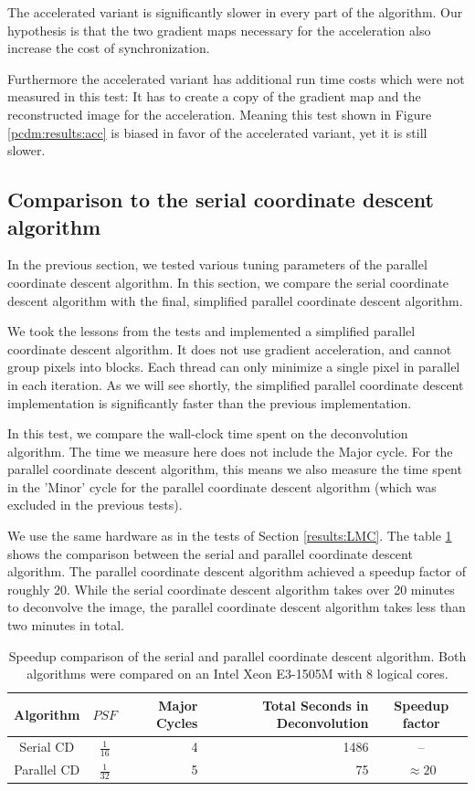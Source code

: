 The accelerated variant is significantly slower in every part of the algorithm. Our hypothesis is that the two gradient maps necessary for the acceleration also increase the cost of synchronization.

Furthermore the accelerated variant has additional run time costs which were not measured in this test: It has to create a copy of the gradient map and the reconstructed image for the acceleration. Meaning this test shown in Figure \ref{pcdm:results:acc} is biased in favor of the accelerated variant, yet it is still slower.


\subsection{Comparison to the serial coordinate descent algorithm}
In the previous section, we tested various tuning parameters of the parallel coordinate descent algorithm. In this section, we compare the serial coordinate descent algorithm with the final, simplified parallel coordinate descent algorithm.

We took the lessons from the tests and implemented a simplified parallel coordinate descent algorithm. It does not use gradient acceleration, and cannot group pixels into blocks. Each thread can only minimize a single pixel in parallel in each iteration. As we will see shortly, the simplified parallel coordinate descent implementation is significantly faster than the previous implementation.

In this test, we compare the wall-clock time spent on the deconvolution algorithm. The time we measure here does not include the Major cycle. For the parallel coordinate descent algorithm, this means we also measure the time spent in the 'Minor' cycle for the parallel coordinate descent algorithm (which was excluded in the previous tests).

We use the same hardware as in the tests of Section \ref{results:LMC}. The table \ref{pcdm:comp:table} shows the comparison between the serial and parallel coordinate descent algorithm. The parallel coordinate descent algorithm achieved a speedup factor of roughly $20$. While the serial coordinate descent algorithm takes over 20 minutes to deconvolve the image, the parallel coordinate descent algorithm takes less than two minutes in total.

\begin{table} [h]
	\centering
	\begin{tabular}{c | c | r | r | c}
		Algorithm &  $PSF$  & Major Cycles & Total Seconds in Deconvolution & Speedup factor\\ \hline
		Serial CD & $\frac{1}{16}$ & 4 & 1486 & --\\
		Parallel CD & $\frac{1}{32}$ & 5 & 75 & $\approx 20$ \\
	\end{tabular}
	\caption{Speedup comparison of the serial and parallel coordinate descent algorithm. Both algorithms were compared on an Intel Xeon E3-1505M with 8 logical cores.}
	\label{pcdm:comp:table}
\end{table}

